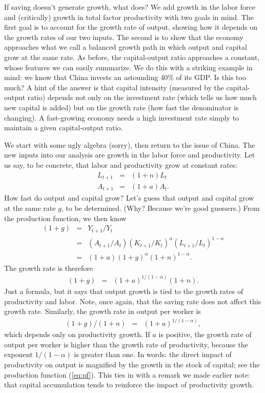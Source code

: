 \documentclass[letterpaper,12pt]{article}
\begin{document}
If saving doesn't generate growth, what does?
We add growth in the labor force and
(critically) growth in total factor productivity
with two goals in mind.
The first goal is to account for the growth rate of output,
showing how it depends on the growth rates of our two inputs.
The second is to show that the economy approaches
what we call a balanced growth path in which
output and capital grow at the same rate.
As before, the capital-output ratio approaches a constant,
whose features we can easily summarize.
We do this with a striking example in mind:
we know that China invests an astounding 40\% of its GDP.
Is this too much?
A hint of the answer is that capital intensity
(measured by the capital-output ratio)
depends not only on the investment rate (which tells us how
much new capital is added) but on the growth rate
(how fast the denominator is changing).
A fast-growing economy needs a high investment rate
simply to maintain a given capital-output ratio.


We start with some ugly algebra (sorry), 
then return to the issue of China.  
The new inputs into our analysis are growth in the labor force
and productivity.
Let us say, to be concrete,
that labor and productivity grow
at constant rates:
\begin{eqnarray*}
    L_{t+1} &=&  (1+n) L_t \\
    A_{t+1} &=&  (1+a) A_t .
\end{eqnarray*}
How fast do output and capital grow?
Let's guess that output and capital grow at the same rate $g$,
to be determined.
(Why?  Because we're good guessers.)
From the production function, we then know
\begin{eqnarray*}
    (1+g)       &=& Y_{t+1}/Y_t  \\
                &=&  (A_{t+1}/A_t) (K_{t+1}/K_t)^\alpha
                        (L_{t+1}/L_t)^{1-\alpha} \\
                &=& (1+a) (1+g)^{\alpha} (1+n)^{1-\alpha} .                        \end{eqnarray*}
The growth rate is therefore
\begin{eqnarray*}
    (1+g)       &=& (1+a)^{1/(1-\alpha)} (1+n) .                        \end{eqnarray*}
Just a formula, but it says that output growth is tied
to the growth rates of productivity and labor.
Note, once again, that the saving rate does not affect this growth rate.
Similarly, the growth rate in output per worker is
\begin{eqnarray*}
    (1+g)/(1+n)     &=& (1+a)^{1/(1-\alpha)} ,                        \end{eqnarray*}
which depends only on productivity growth.
If $a$ is positive,
the growth rate of output per worker is
higher than the growth rate of productivity,
because the exponent $ 1/(1-\alpha)$ is greater than one.
In words:  the direct impact of productivity on output
is magnified by the growth in the stock of capital;
see the production function (\ref{eq:pf}).
This ties in with a remark we made earlier note:
that capital accumulation
tends to reinforce the impact of productivity growth.
\end{document}
